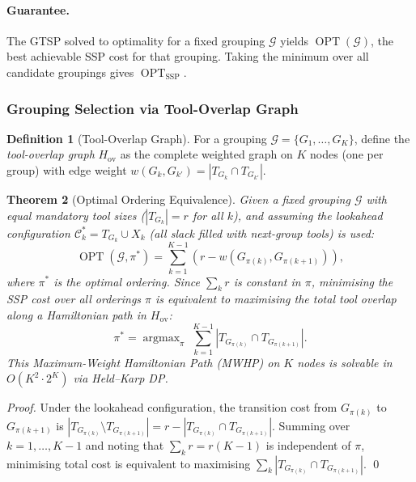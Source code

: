 \documentclass[11pt,a4paper]{article}
\theoremstyle{plain}
\newtheorem{theorem}{Theorem}[section]
\theoremstyle{definition}
\newtheorem{definition}[theorem]{Definition}
\DeclareMathOperator{\OPT}{OPT}
\DeclareMathOperator*{\argmax}{argmax}
\newcommand{\calG}{\mathcal{G}}     %
\begin{document}
\paragraph{Guarantee.}
The GTSP solved to optimality for a fixed grouping $\calG$ yields $\OPT(\calG)$,
the best achievable SSP cost for that grouping.
Taking the minimum over all candidate groupings gives $\OPT_{\text{SSP}}$.

\subsubsection{Grouping Selection via Tool-Overlap Graph}
\label{sec:overlap-graph}

\begin{definition}[Tool-Overlap Graph]
\label{def:overlap}
For a grouping $\calG = \{G_1,\ldots,G_K\}$, define the
\emph{tool-overlap graph} $H_{\mathrm{ov}}$ as the complete weighted graph on
$K$ nodes (one per group) with edge weight
$w(G_k, G_{k'}) = |T_{G_k} \cap T_{G_{k'}}|$.
\end{definition}

\begin{thmbox}
\begin{theorem}[Optimal Ordering Equivalence]
\label{thm:overlap}
Given a fixed grouping $\calG$ with equal mandatory tool sizes ($|T_{G_k}| = r$
for all $k$), and assuming the lookahead configuration $\mathcal{C}_k^* = T_{G_k} \cup X_k$
(all slack filled with next-group tools) is used:
\[
  \OPT(\calG, \pi^*)
  = \sum_{k=1}^{K-1} (r - w(G_{\pi(k)}, G_{\pi(k+1)})),
\]
where $\pi^*$ is the optimal ordering. Since $\sum_k r$ is constant in $\pi$,
minimising the SSP cost over all orderings $\pi$ is equivalent to
\emph{maximising} the total tool overlap along a Hamiltonian path in $H_{\mathrm{ov}}$:
\[
  \pi^* = \argmax_{\pi}\; \sum_{k=1}^{K-1} |T_{G_{\pi(k)}} \cap T_{G_{\pi(k+1)}}|.
\]
This Maximum-Weight Hamiltonian Path (MWHP) on $K$ nodes is solvable in
$O(K^2 \cdot 2^K)$ via Held--Karp DP.
\end{theorem}
\end{thmbox}

\begin{proof}
Under the lookahead configuration, the transition cost from $G_{\pi(k)}$ to $G_{\pi(k+1)}$
is $|T_{G_{\pi(k)}} \setminus T_{G_{\pi(k+1)}}| = r - |T_{G_{\pi(k)}} \cap T_{G_{\pi(k+1)}}|$.
Summing over $k = 1,\ldots,K-1$ and noting that
$\sum_k r = r(K-1)$ is independent of $\pi$, minimising total cost is equivalent to
maximising $\sum_k |T_{G_{\pi(k)}} \cap T_{G_{\pi(k+1)}}|$. \qed
\end{proof}
\end{document}
